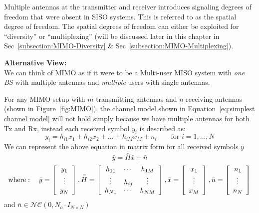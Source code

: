 Multiple antennas at the transmitter and receiver introduces signaling degrees of freedom that were absent in SISO systems. This is referred to as the spatial degree of freedom. The spatial degrees of freedom can either be exploited for “diversity” or “multiplexing” (will be discussed later in this chapter in Sec~\ref{subsection:MIMO-Diversity} \& Sec~\ref{subsection:MIMO-Multiplexing}).

\begin{GrayBox}
    \textbf{Alternative View:} \\
    We can think of MIMO as if it were to be a Multi-user MISO system with \emph{one BS} with multiple antennas and \emph{multiple} users with single antennas.
\end{GrayBox}

For any MIMO setup with $m$ transmitting antennas and $n$ receiving antennas (shown in Figure~\ref{fig:MIMO}), the channel model shown in Equation~\ref{eq:simplest channel model} will not hold simply because we have multiple antennas for both Tx and Rx, instead each received symbol $y_i$ is described as:
\begin{equation}
    \label{eq:y_i MIMO}
    y_i = h_{i1} x_1 + h_{i2} x_2 + \ldots + h_{iM} x_M + n_i \qquad \text{for } i=1,\ldots,N
\end{equation}
We can represent the above equation in matrix form for all received symbols $\bar{y}$
\begin{equation}
    \label{eq:y_bar MIMO}
    \bar{y} = \bar{\bar{H}} \bar{x} + \bar{n}
\end{equation}
\[ \text{where}: \quad \bar{y} = \left[ \begin{array}{c}
    y_1 \\
    \vdots \\
    y_N
\end{array} \right] , \bar{\bar{H}} = \left[ \begin{array}{c c c}
    h_{11} & \cdots & h_{1M} \\
    \vdots & h_{ij} & \vdots \\
    h_{N1} & \cdots & h_{NM}
\end{array} \right] , \bar{x} = \left[ \begin{array}{c}
    x_1 \\
    \vdots \\
    x_M
\end{array} \right] , \bar{n} = \left[ \begin{array}{c}
    n_1 \\
    \vdots \\
    n_N     
\end{array} \right] \]
and $\bar{n} \in \mathcal{N} \mathcal{C}\left( 0, N_o \cdot I_{N \times N} \right)$

